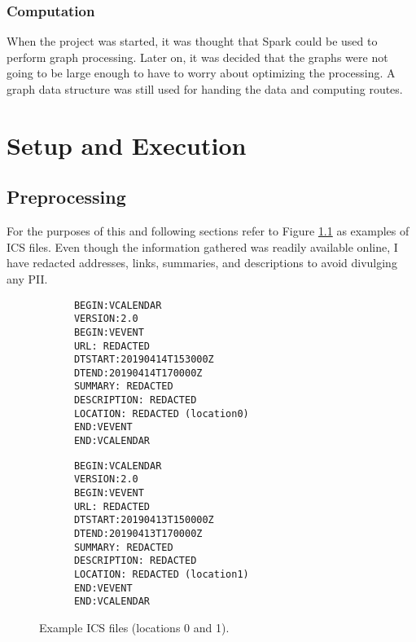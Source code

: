 \documentclass[letterpaper,11pt]{report}
\theoremstyle{definition}
\theoremstyle{definition}
\begin{document}
\subsection{Computation}

When the project was started, it was thought that Spark could be used to perform graph processing\cite{SPARK}. Later on, it was decided that the graphs were not going to be large enough to have to worry about optimizing the processing. A graph data structure\cite{Agarwal} was still used for handing the data and computing routes.

\chapter{Setup and Execution}
\section{Preprocessing}\label{preprocessing}
For the purposes of this and following sections refer to Figure \ref{ICS-Examples} as examples of ICS files. Even though the information gathered was readily available online, I have redacted addresses, links, summaries, and descriptions to avoid divulging any PII.
\begin{figure}[!htb]
  \begin{center}
    \begin{lstlisting}
      BEGIN:VCALENDAR
      VERSION:2.0
      BEGIN:VEVENT
      URL: REDACTED
      DTSTART:20190414T153000Z
      DTEND:20190414T170000Z
      SUMMARY: REDACTED
      DESCRIPTION: REDACTED
      LOCATION: REDACTED (location0)
      END:VEVENT
      END:VCALENDAR
    \end{lstlisting}
    \begin{lstlisting}
      BEGIN:VCALENDAR
      VERSION:2.0
      BEGIN:VEVENT
      URL: REDACTED
      DTSTART:20190413T150000Z
      DTEND:20190413T170000Z
      SUMMARY: REDACTED
      DESCRIPTION: REDACTED
      LOCATION: REDACTED (location1)
      END:VEVENT
      END:VCALENDAR
    \end{lstlisting}
    \caption{Example ICS files (locations 0 and 1).}\label{ICS-Examples}
    \end{center}
  \end{figure}
\end{document}
